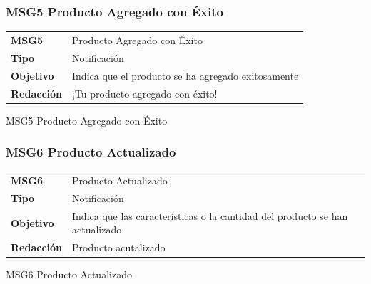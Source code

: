 \documentclass[14pt]{article}
\begin{document}
            \subsubsection{MSG5 Producto Agregado con Éxito}\label{MSG5 Producto Agregado con Éxito}
                \begin{table}[H]
                    \begin{center}
                        \begin{tabular}{| l | l | } \hline
                        \textbf{MSG5} & Producto Agregado con Éxito \\
                        \textbf{Tipo} & Notificación \\
                        \textbf{Objetivo} & Indica que el producto se ha agregado exitosamente \\
                        \textbf{Redacción} & ¡Tu producto agregado con éxito! \\ \hline
                        \end{tabular}
                        
                        \vspace{0.3cm} MSG5 Producto Agregado con Éxito
                    \end{center}
                \end{table}
                
            \subsubsection{MSG6 Producto Actualizado}\label{MSG6 Producto Actualizado}
                \begin{table}[H]
                    \begin{center}
                        \begin{tabular}{| l | l | } \hline
                        \textbf{MSG6} & Producto Actualizado \\
                        \textbf{Tipo} & Notificación \\
                        \textbf{Objetivo} & Indica que las características o la cantidad del producto se han actualizado \\
                        \textbf{Redacción} & Producto acutalizado \\ \hline
                        \end{tabular}
                        
                        \vspace{0.3cm} MSG6 Producto Actualizado
                    \end{center}
                \end{table}
                
\end{document}
